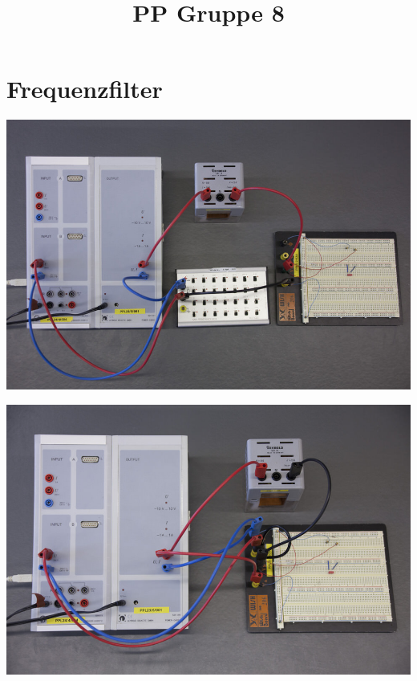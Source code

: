 \documentclass[11pt]{beamer}
\title{PP Gruppe 8}
\begin{document}
\frame[c]{\titlepage}
\begin{frame}
\tableofcontents
\end{frame}


\section{Frequenzfilter}
\begin{frame}
	\includegraphics[width=\textwidth]{images/1/durchlassfilter}
\end{frame}

\begin{frame}
	\includegraphics[width=\textwidth]{images/1/sperrfilter}
\end{frame}
\end{document}
